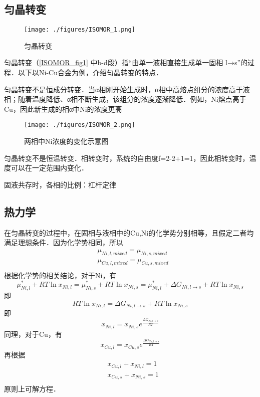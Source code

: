 
\subsection{匀晶转变}
\begin{figure}[ht]
\centering
\texttt{[image: ./figures/ISOMOR\_1.png]}
\caption{匀晶转变} \label{ISOMOR_fig1}
\end{figure}

匀晶转变（\autoref{ISOMOR_fig1} 中b-d段）指“由单一液相直接生成单一固相 l→s”的过程．以下以Ni-Cu合金为例，介绍匀晶转变的特点．

匀晶转变不是恒成分转变．当α相刚开始生成时，α相中高熔点组分的浓度高于液相；随着温度降低、α相不断生成，该组分的浓度逐渐降低．例如，Ni熔点高于Cu，因此新生成的相α中Ni的浓度更高
\begin{figure}[ht]
\centering
\texttt{[image: ./figures/ISOMOR\_2.png]}
\caption{两相中Ni浓度的变化示意图} \label{ISOMOR_fig2}
\end{figure}

匀晶转变不是恒温转变．相转变时，系统的自由度f=2-2+1=1，因此相转变时，温度可以在一定范围内变化．

固液共存时，各相的比例：杠杆定律

\subsection{热力学}
在匀晶转变的过程中，在固相与液相中的Cu,Ni的化学势分别相等，且假定二者均满足理想条件．因为化学势相同，所以
\begin{align}
&\mu_{Ni,l,mixed}=\mu_{Ni,s,mixed}\\
&\mu_{Cu,l,mixed}=\mu_{Cu,s,mixed}\\
\end{align}
根据化学势的相关结论，对于Ni，有
$$
\mu_{Ni,l}^*+RT \ln x_{Ni,l}=\mu_{Ni,s}^*+RT \ln x_{Ni,s}=\mu_{Ni,l}^*+\Delta G_{Ni, l\rightarrow s} + RT \ln x_{Ni,s}
$$
即
$$
RT \ln x_{Ni,l}=\Delta G_{Ni, l\rightarrow s} + RT \ln x_{Ni,s}
$$
即
\begin{equation}
x_{Ni,l}=x_{Ni,s}e^{\frac{\Delta G_{Ni, l\rightarrow s}}{RT}}
\end{equation}
同理，对于Cu，有
\begin{equation}
x_{Cu,l}=x_{Cu,s}e^{\frac{\Delta G_{Cu, l\rightarrow s}}{RT}}
\end{equation}
再根据
\begin{align}
&x_{Cu,l}+x_{Ni,l}=1\\
&x_{Cu,s}+x_{Ni,s}=1\\
\end{align}
原则上可解方程．
